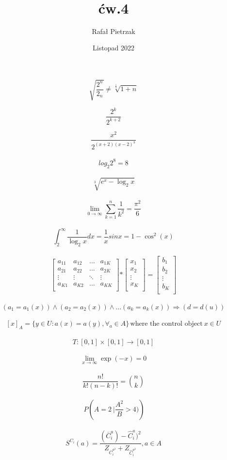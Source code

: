 \documentclass[12pt, letterpaper, titlepage]{article}
\title{ćw.4 }
\author{Rafał Pietrzak}
\date{Listopad 2022}
\begin{document}
\maketitle

 $$ \sqrt{ \frac{2^{n}}{2_n}} \neq \sqrt[\frac{1}{3}]{1+n} $$

 $$ \frac{2^{k}}{2^{k+2}} $$

 $$ \frac{x^{2}}{2^{(x+2)(x-2)^{3}}} $$
\\
 $$ log_{2}2^8 = 8 $$ 
\\
 $$ \sqrt[3]{e^{x}-\log_{2}x} $$
\\
 $$ \lim_{0\to\infty}\sum_{k=1}^{n}\frac{1}{k^2}=\frac{\pi^2}{6} $$
\\
 $$ \int_{2}^{\infty}\frac{1}{\log_{2}x}dx = \frac{1}{x}sinx = 1 - \cos^{2}(x) $$
 \\
 $$\mathbf{} 
\left[ \begin{array}{cccc}

a_{11} & a_{12} & \ldots & a_{1K} \\
a_{21} & a_{22} & \ldots & a_{2K} \\
\vdots & \vdots & \ddots & \vdots \\
a_{K1} & a_{K2} & \ldots & a_{KK} \\

\end{array} \right] 
\mathbf{*}
\left[\begin{array}{c}

x_{1}   \\
x_{2}   \\
\vdots  \\
x_{K}    \\

\end{array} \right]
\mathbf{=}
\left[\begin{array}{c}

b_{1}   \\
b_{2}   \\
\vdots  \\
b_{K}    \\

\end{array} \right]
$$
\\
$$ (a_{1} = a_{1}(x)) \wedge (a_{2} = a_{2}(x)) \wedge ... (a_{k} =
 a_{k}(x)) \Rightarrow (d = d(u)) $$ 
\\
$$ [x]_{A} = \{y \in U :a(x) = a(y),\forall_a \in A  \}\, \textrm {where the control object} \ x \in U $$
\\
$$ T : [0,1] \times [0,1] \to [0,1] $$
\\
$$ \lim_{x\to\infty}\exp(-x)=0 $$
\\
$$ \frac{n!}{k!(n-k)!}={n \choose k} $$
\\
$$
\ P \left(A=2\ \bigg|\frac{A^2}{B}>4) \right)
$$
\\
$$
S^{C_{i}}(a)=\frac{(\overline{C}^{a}_{i})-\hat{C}^{a}_{i})^{2}}{Z_{\overline{C}^{a^{2}}_{i}}+Z_{\hat{C}^{a^{2}}_{i}}}, a \in A
$$
\end{document}
